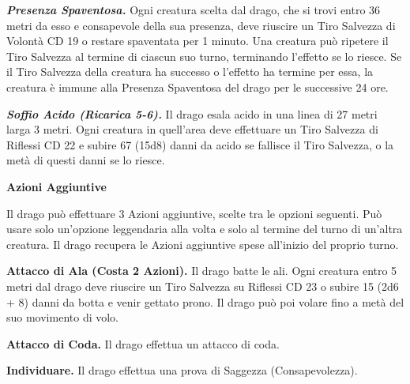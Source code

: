 \begin{multicols}{2}
\emph{\textbf{Presenza Spaventosa.}} Ogni creatura scelta dal drago, che si trovi entro 36 metri da esso e consapevole della sua presenza, deve riuscire un Tiro Salvezza di Volontà CD 19 o restare spaventata per 1 minuto. Una creatura può ripetere il Tiro Salvezza al termine di ciascun suo turno, terminando l'effetto se lo riesce. Se il Tiro Salvezza della creatura ha successo o l'effetto ha termine per essa, la creatura è immune alla Presenza Spaventosa del drago per le successive 24 ore.

\emph{\textbf{Soffio Acido (Ricarica 5-6).}} Il drago esala acido in una linea di 27 metri larga 3 metri. Ogni creatura in quell'area deve effettuare un Tiro Salvezza di Riflessi CD 22 e subire 67 (15d8) danni da acido se fallisce il Tiro Salvezza, o la metà di questi danni se lo riesce.

\textbf{Azioni Aggiuntive}

Il drago può effettuare 3 Azioni aggiuntive, scelte tra le opzioni seguenti. Può usare solo un'opzione leggendaria alla volta e solo al termine del turno di un'altra creatura. Il drago recupera le Azioni aggiuntive spese all'inizio del proprio turno.

\textbf{Attacco di Ala (Costa 2 Azioni).} Il drago batte le ali. Ogni creatura entro 5 metri dal drago deve riuscire un Tiro Salvezza su Riflessi CD 23 o subire 15 (2d6 + 8) danni da botta e venir gettato prono. Il drago può poi volare fino a metà del suo movimento di volo.  

\textbf{Attacco di Coda.} Il drago effettua un attacco di coda.

\textbf{Individuare.} Il drago effettua una prova di Saggezza (Consapevolezza).


\end{multicols}
